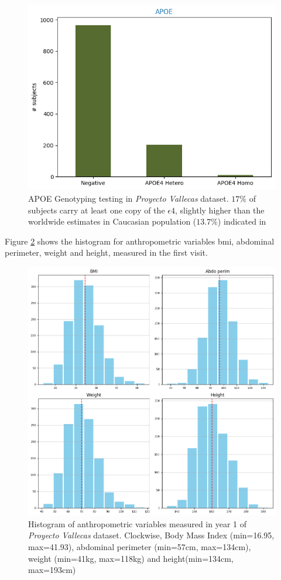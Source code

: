\documentclass[11pt]{article}
\theoremstyle{definition}
\theoremstyle{remark}
\begin{document}
\begin{figure}[H]
        \centering
        \includegraphics[keepaspectratio, width=0.6\linewidth]{figures/Fig_apoe}
        \caption{APOE Genotyping testing in \emph{Proyecto Vallecas} dataset. $17\%$ of subjects carry at least one copy of the $\epsilon4$, slightly higher than the worldwide estimates in Caucasian population ($13.7\%$) indicated in \cite{farrer1997effects}} 
        \label{fig:apoe}
\end{figure}

Figure \ref{fig:anthro} shows the histogram for anthropometric variables bmi, abdominal perimeter, weight and height, measured in the first visit.
\begin{figure}[H]
        \centering
        \includegraphics[keepaspectratio, width=.8\linewidth]{figures/Fig_anthro}
        \caption{Histogram of anthropometric variables measured in year 1 of \emph{Proyecto Vallecas} dataset. Clockwise, Body Mass Index (min=16.95, max=41.93), abdominal perimeter (min=57cm, max=134cm), weight (min=41kg, max=118kg) and height(min=134cm, max=193cm)} 
        \label{fig:anthro}
\end{figure}
\end{document}
